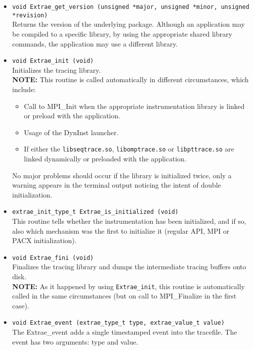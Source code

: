 \begin{itemize}

 \item {\tt void Extrae\_get\_version (unsigned *major, unsigned *minor, unsigned *revision)}\\
 Returns the version of the underlying \TRACE package. Although an application may be compiled to a specific \TRACE library, by using the appropriate shared library commands, the application may use a different \TRACE library.

 \item {\tt void Extrae\_init (void)}\\
 Initializes the tracing library.\\
 {\bf NOTE:} This routine is called automatically in different circumstances, which include:
    \begin{itemize}
      \item Call to MPI\_Init when the appropriate instrumentation library is linked or preload with the application.
      \item Usage of the DynInst launcher.
      \item If either the {\tt libseqtrace.so}, {\tt libomptrace.so} or {\tt libpttrace.so} are linked dynamically or preloaded with the application.
    \end{itemize}
  No major problems should occur if the library is initialized twice, only a warning appears in the terminal output noticing the intent of double initialization.

 \item {\tt extrae\_init\_type\_t Extrae\_is\_initialized (void)}\\
 This routine tells whether the instrumentation has been initialized, and if so, also which mechanism was the first to initialize it (regular API, MPI or PACX initialization).

 \item {\tt void Extrae\_fini (void)}\\
 Finalizes the tracing library and dumps the intermediate tracing buffers onto disk.\\
 {\bf NOTE:} As it happened by using {\tt Extrae\_init}, this routine is automatically called in the same circumstances (but on call to MPI\_Finalize in the first case).

 \item {\tt void Extrae\_event (extrae\_type\_t type, extrae\_value\_t value)}\\
 The Extrae\_event adds a single timestamped event into the tracefile. The event has two arguments: type and value.


\end{itemize}
